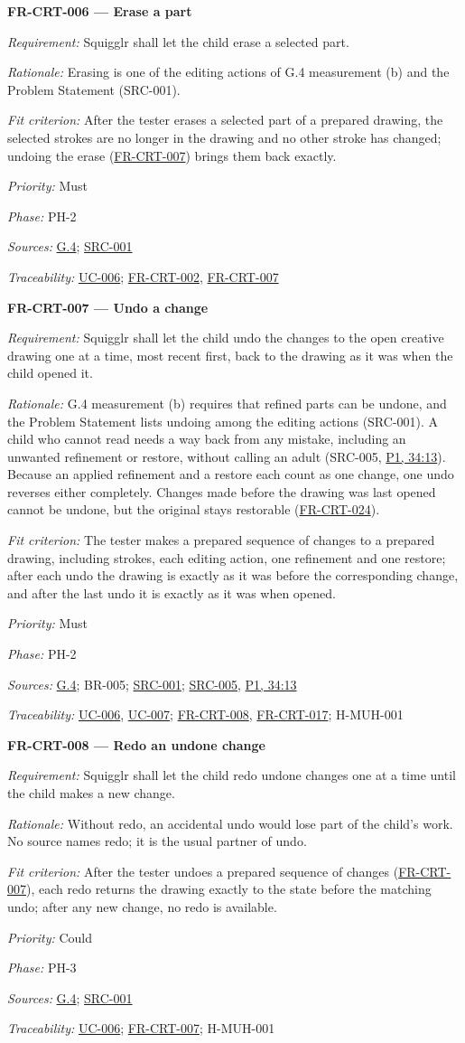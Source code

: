 \documentclass[12pt]{article}
\renewcommand{\_}{\textunderscore\allowbreak}%
\newcommand{\intlink}[3]{\hyperref[int:#1-#2]{#3}}
\newcommand{\intref}[2]{\intlink{#1}{#2}{#1, #2}}
\newcommand{\goalref}[1]{\hyperref[goal:#1]{G.#1}}
\newcommand{\ucref}[1]{\hyperref[uc:#1]{\mbox{UC-#1}}}
\newenvironment{srsrequirement}[2]{%
  \par\medskip\noindent\phantomsection\label{req:#1}%
  \textbf{#1 --- #2}\par\nobreak\smallskip }{\par\medskip}
\newcommand{\reqfield}[2]{\noindent\textit{#1:} #2\par}
\newcommand{\reqshall}[1]{\reqfield{Requirement}{#1}}
\newcommand{\reqrationale}[1]{\reqfield{Rationale}{#1}}
\newcommand{\reqfit}[1]{\reqfield{Fit criterion}{#1}}
\newcommand{\reqpriority}[1]{\reqfield{Priority}{#1}}
\newcommand{\reqphase}[1]{\reqfield{Phase}{#1}}
\newcommand{\reqsources}[1]{\reqfield{Sources}{#1}}
\newcommand{\reqtraces}[1]{\reqfield{Traceability}{#1}}
\newcommand{\reqref}[1]{\hyperref[req:#1]{#1}}
\newcommand{\srcref}[1]{\hyperref[src:#1]{SRC-#1}}
\providecommand{\ucref}[1]{\hyperref[uc:#1]{UC-#1}}
\begin{document}
\begin{srsrequirement}{FR-CRT-006}{Erase a part}
  \reqshall{Squigglr shall let the child erase a selected part.}
  \reqrationale{Erasing is one of the editing actions of G.4 measurement (b) and
the Problem Statement (SRC-001).} \reqfit{After the tester erases a selected
part of a prepared drawing, the selected strokes are no longer in the drawing
and no other stroke has changed; undoing the erase (\reqref{FR-CRT-007}) brings
them back exactly.}
  \reqpriority{Must}
  \reqphase{PH-2}
  \reqsources{\goalref{4}; \srcref{001}} \reqtraces{\ucref{006};
  \reqref{FR-CRT-002}, \reqref{FR-CRT-007}}
\end{srsrequirement}

\begin{srsrequirement}{FR-CRT-007}{Undo a change}
  \reqshall{Squigglr shall let the child undo the changes to the open creative
drawing one at a time, most recent first, back to the drawing as it was when the
child opened it.} \reqrationale{G.4 measurement (b) requires that refined parts
can be undone, and the Problem Statement lists undoing among the editing actions
(SRC-001). A child who cannot read needs a way back from any mistake, including
an unwanted refinement or restore, without calling an adult (SRC-005,
\intref{P1}{34:13}). Because an applied refinement and a restore each count as
one change, one undo reverses either completely. Changes made before the drawing
was last opened cannot be undone, but the original stays restorable
(\reqref{FR-CRT-024}).} \reqfit{The tester makes a prepared sequence of changes
to a prepared drawing, including strokes, each editing action, one refinement
and one restore; after each undo the drawing is exactly as it was before the
corresponding change, and after the last undo it is exactly as it was when
opened.}
  \reqpriority{Must}
  \reqphase{PH-2}
  \reqsources{\goalref{4}; BR-005; \srcref{001}; \srcref{005},
  \intref{P1}{34:13}} \reqtraces{\ucref{006}, \ucref{007}; \reqref{FR-CRT-008},
  \reqref{FR-CRT-017}; H-MUH-001}
\end{srsrequirement}

\begin{srsrequirement}{FR-CRT-008}{Redo an undone change}
  \reqshall{Squigglr shall let the child redo undone changes one at a time until
the child makes a new change.} \reqrationale{Without redo, an accidental undo
would lose part of the child's work. No source names redo; it is the usual
partner of undo.} \reqfit{After the tester undoes a prepared sequence of changes
(\reqref{FR-CRT-007}), each redo returns the drawing exactly to the state before
the matching undo; after any new change, no redo is available.}
  \reqpriority{Could}
  \reqphase{PH-3}
  \reqsources{\goalref{4}; \srcref{001}} \reqtraces{\ucref{006};
  \reqref{FR-CRT-007}; H-MUH-001}
\end{srsrequirement}
\end{document}
